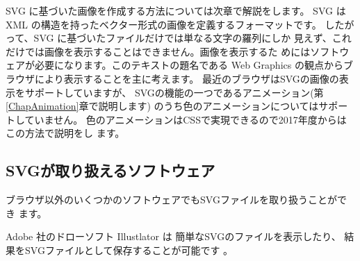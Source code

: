 SVG に基づいた画像を作成する方法については次章で解説をします。
%
SVG は XML の構造を持ったベクター形式の画像を定義するフォーマットです。
したがって、SVG に基づいたファイルだけでは単なる文字の羅列にしか
見えず、これだけでは画像を表示することはできません。画像を表示するた
めにはソフトウェアが必要になります。このテキストの題名である Web
Graphics の観点からブラウザにより表示することを主に考えます。
最近のブラウザはSVGの画像の表示をサポートしていますが、
SVGの機能の一つであるアニメーション(第\ref{ChapAnimation}章で説明します)
のうち色のアニメーションについてはサポートしていません。
色のアニメーションはCSSで実現できるので2017年度からはこの方法で説明をし
ます。

\subsection{SVGが取り扱えるソフトウェア}
ブラウザ以外のいくつかのソフトウェアでもSVGファイルを取り扱うことができ
ます。

Adobe 社のドローソフト Illustlator は 簡単なSVGのファイルを表示したり、
結果をSVGファイルとして保存することが可能です
。

